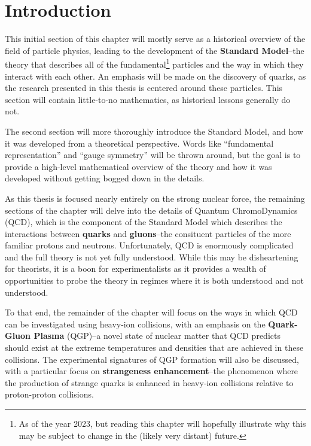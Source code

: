 \chapter{Introduction}

This initial section of this chapter will mostly serve as a historical overview of the field of particle physics, leading to the development of the \textbf{Standard Model}--the theory that describes all of the fundamental\footnote{As of the year 2023, but reading this chapter will hopefully illustrate why this may be subject to change in the (likely very distant) future.} particles and the way in which they interact with each other. An emphasis will be made on the discovery of quarks, as the research presented in this thesis is centered around these particles. This section will contain little-to-no mathematics, as historical lessons generally do not. 

The second section will more thoroughly introduce the Standard Model, and how it was developed from a theoretical perspective. Words like ``fundamental representation'' and ``gauge symmetry'' will be thrown around, but the goal is to provide a high-level mathematical overview of the theory and how it was developed without getting bogged down in the details.

As this thesis is focused nearly entirely on the strong nuclear force, the remaining sections of the chapter will delve into the details of Quantum ChromoDynamics (QCD), which is the component of the Standard Model which describes the interactions between \textbf{quarks} and \textbf{gluons}--the consituent particles of the more familiar protons and neutrons. Unfortunately, QCD is enormously complicated and the full theory is not yet fully understood. While this may be disheartening for theorists, it is a boon for experimentalists as it provides a wealth of opportunities to probe the theory in regimes where it is both understood and not understood. 

To that end, the remainder of the chapter will focus on the ways in which QCD can be investigated using heavy-ion collisions, with an emphasis on the \textbf{Quark-Gluon Plasma} (QGP)--a novel state of nuclear matter that QCD predicts should exist at the extreme temperatures and densities that are achieved in these collisions. The experimental signatures of QGP formation will also be discussed, with a particular focus on \textbf{strangeness enhancement}--the phenomenon where the production of strange quarks is enhanced in heavy-ion collisions relative to proton-proton collisions. 

